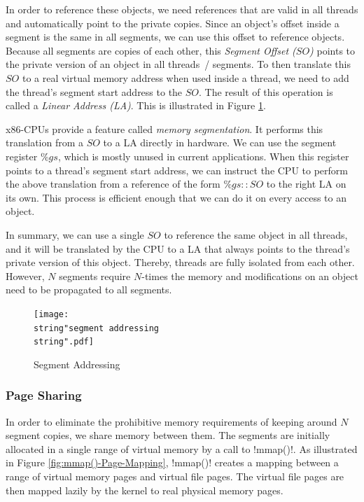 \documentclass{sigplanconf}
\makeatletter
\renewcommand\lstinline[1][]{%
  \Collectverb{\@@myverb}%
}
\def\@@myverb#1{%
    \begingroup
    \fboxsep=0.2em
    \colorbox{verylightgray}{\oldlstinline|#1|}%
    \endgroup
}
\makeatother
\begin{document}
In order to reference these objects, we need references that are valid
in all threads and automatically point to the private copies. Since
an object's offset inside a segment is the same in all segments, we
can use this offset to reference objects. Because all segments are
copies of each other, this \emph{Segment Offset ($SO$)} points to the
private version of an object in all threads~/ segments. To then
translate this $SO$ to a real virtual memory address when used inside a
thread, we need to add the thread's segment start address to the
$SO$. The result of this operation is called a \emph{Linear Address
  (LA)}. This is illustrated in Figure \ref{fig:Segment-Addressing}.

x86-CPUs provide a feature called \emph{memory segmentation}. It
performs this translation from a $SO$ to a LA directly in hardware.  We
can use the segment register $\%gs$, which is mostly unused in current
applications. When this register points to a thread's segment start
address, we can instruct the CPU to perform the above translation from
a reference of the form $\%gs{::}SO$ to the right LA on its own. This
process is efficient enough that we can do it on every access to an
object.

In summary, we can use a single $SO$ to reference the same object in all
threads, and it will be translated by the CPU to a LA that always
points to the thread's private version of this object. Thereby,
threads are fully isolated from each other. However, $N$ segments
require $N$-times the memory and modifications on an object need to be
propagated to all segments.

\begin{figure}[t]
  \centering
  \texttt{[image: \\string"segment addressing\\string".pdf]}
  \caption{Segment Addressing\label{fig:Segment-Addressing}}
\end{figure}



\subsubsection{Page Sharing}

In order to eliminate the prohibitive memory requirements of keeping
around $N$ segment copies, we share memory between them. The segments
are initially allocated in a single range of virtual memory by a call
to \lstinline!mmap()!.  As illustrated in Figure
\ref{fig:mmap()-Page-Mapping}, \lstinline!mmap()! creates a mapping
between a range of virtual memory pages and virtual file pages. The
virtual file pages are then mapped lazily by the kernel to real
physical memory pages.
\end{document}
